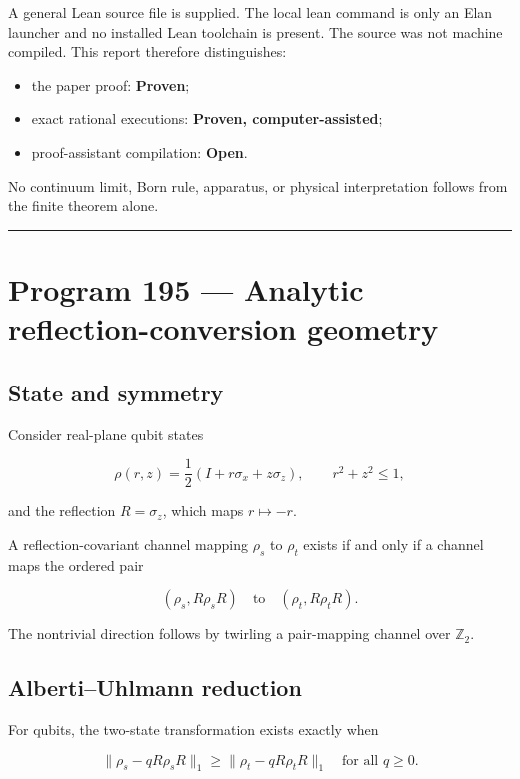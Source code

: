 \documentclass[11pt,a4paper,openany]{report}
\begin{document}
A general Lean source file is supplied. The local lean command is only an Elan launcher and no installed Lean toolchain is present. The source was not machine compiled. This report therefore distinguishes:

\begin{itemize}
\item 
the paper proof: \textbf{Proven};

\item 
exact rational executions: \textbf{Proven, computer-assisted};

\item 
proof-assistant compilation: \textbf{Open}.

\end{itemize}

No continuum limit, Born rule, apparatus, or physical interpretation follows from the finite theorem alone.

\par\medskip\hrule\medskip

\chapter{Program 195 --- Analytic reflection-conversion geometry}

\section{State and symmetry}

Consider real-plane qubit states

\[
\rho(r,z)
=
\frac12(I+r\sigma_x+z\sigma_z),
\qquad
r^2+z^2\le1,
\]

and the reflection \(R=\sigma_z\), which maps \(r\mapsto-r\).

A reflection-covariant channel mapping \(\rho_s\) to \(\rho_t\) exists if and only if a channel maps the ordered pair

\[
(\rho_s,R\rho_sR)
\quad\text{to}\quad
(\rho_t,R\rho_tR).
\]

The nontrivial direction follows by twirling a pair-mapping channel over \(\mathbb Z_2\).

\section{Alberti--Uhlmann reduction}

For qubits, the two-state transformation exists exactly when

\[
\|\rho_s-qR\rho_sR\|_1
\ge
\|\rho_t-qR\rho_tR\|_1
\quad
\text{for all }q\ge0.
\]
\end{document}
